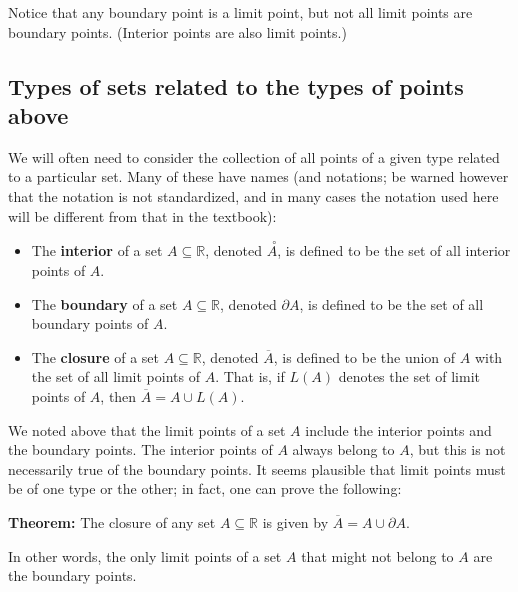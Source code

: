\documentclass[12pt,letterpaper]{article}
\newcommand{\R}{\mathbb{R}}
\newcommand{\inter}[1]{\overset{\,\,\,\circ}{#1}}
\begin{document}
Notice that any boundary point is a limit point, but not all limit points are boundary points. (Interior points are also limit points.)

\subsection*{Types of sets related to the types of points above}
We will often need to consider the collection of all points of a given type related to a particular set. Many of these have names (and notations; be warned however that the notation is not standardized, and in many cases the notation used here will be different from that in the textbook):
\begin{itemize}
\item The {\bf interior} of a set $A\subseteq \R$, denoted $\inter{A}$, is defined to be the set of all interior points of $A$.
\item The {\bf boundary} of a set $A\subseteq \R$, denoted $\partial A$, is defined to be the set of all boundary points of $A$.
\item The {\bf closure} of a set $A\subseteq \R$, denoted $\overline{A}$, is defined to be the union of $A$ with the set of all limit points of $A$. That is, if $L(A)$ denotes the set of limit points of $A$, then $\overline{A}=A\cup L(A)$.
\end{itemize}
We noted above that the limit points of a set $A$ include the interior points and the boundary points. The interior points of $A$ always belong to $A$, but this is not necessarily true of the boundary points. It seems plausible that limit points must be of one type or the other; in fact, one can prove the following:

{\bf Theorem:} The closure of any set $A\subseteq \R$ is given by $\overline{A} = A\cup \partial A$.

In other words, the only limit points of a set $A$ that might not belong to $A$ are the boundary points.
\end{document}
